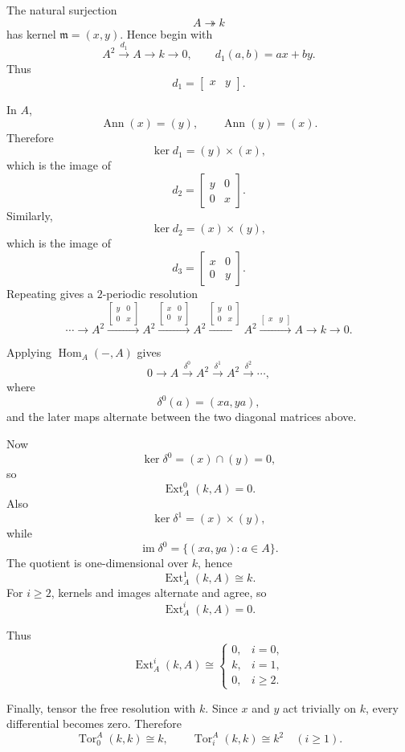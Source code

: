 \begin{solution}
The natural surjection
\[
A\twoheadrightarrow k
\]
has kernel \(\mathfrak m=(x,y)\). Hence begin with
\[
A^2\xrightarrow{d_1}A\to k\to0,
\qquad
d_1(a,b)=ax+by.
\]
Thus
\[
d_1=\begin{bmatrix}x&y\end{bmatrix}.
\]

In \(A\),
\[
\operatorname{Ann}(x)=(y),
\qquad
\operatorname{Ann}(y)=(x).
\]
Therefore
\[
\ker d_1=(y)\times(x),
\]
which is the image of
\[
d_2=
\begin{bmatrix}
y&0\\
0&x
\end{bmatrix}.
\]
Similarly,
\[
\ker d_2=(x)\times(y),
\]
which is the image of
\[
d_3=
\begin{bmatrix}
x&0\\
0&y
\end{bmatrix}.
\]
Repeating gives a \(2\)-periodic resolution
\[
\cdots\to A^2
\xrightarrow{\left[\begin{smallmatrix}y&0\\0&x\end{smallmatrix}\right]}
A^2
\xrightarrow{\left[\begin{smallmatrix}x&0\\0&y\end{smallmatrix}\right]}
A^2
\xrightarrow{\left[\begin{smallmatrix}y&0\\0&x\end{smallmatrix}\right]}
A^2
\xrightarrow{\left[\begin{smallmatrix}x&y\end{smallmatrix}\right]}
A
\to k\to0.
\]

Applying \(\operatorname{Hom}_A(-,A)\) gives
\[
0\to A\xrightarrow{\delta^0}A^2\xrightarrow{\delta^1}A^2
\xrightarrow{\delta^2}\cdots,
\]
where
\[
\delta^0(a)=(xa,ya),
\]
and the later maps alternate between the two diagonal matrices above.

Now
\[
\ker\delta^0=(x)\cap(y)=0,
\]
so
\[
\operatorname{Ext}_A^0(k,A)=0.
\]
Also
\[
\ker\delta^1=(x)\times(y),
\]
while
\[
\operatorname{im}\delta^0=\{(xa,ya):a\in A\}.
\]
The quotient is one-dimensional over \(k\), hence
\[
\operatorname{Ext}_A^1(k,A)\cong k.
\]
For \(i\ge2\), kernels and images alternate and agree, so
\[
\operatorname{Ext}_A^i(k,A)=0.
\]

Thus
\[
\operatorname{Ext}_A^i(k,A)\cong
\begin{cases}
0,&i=0,\\
k,&i=1,\\
0,&i\ge2.
\end{cases}
\]

Finally, tensor the free resolution with \(k\). Since \(x\) and \(y\) act
trivially on \(k\), every differential becomes zero. Therefore
\[
\operatorname{Tor}_0^A(k,k)\cong k,
\qquad
\operatorname{Tor}_i^A(k,k)\cong k^2
\quad(i\ge1).
\]
\end{solution}


